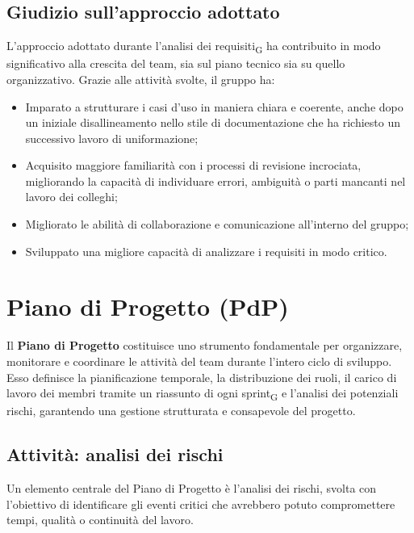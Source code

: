 \documentclass[11pt,a4paper]{article}
\newcommand{\gls}[1]{#1\textsubscript{G}}
\begin{document}
\subsection{Giudizio sull'approccio adottato}
L’approccio adottato durante l’\gls{analisi dei requisiti} ha contribuito in modo significativo alla crescita del team, sia sul piano tecnico sia su quello organizzativo. Grazie alle attività svolte, il gruppo ha:
\begin{itemize}
\item Imparato a strutturare i casi d’uso in maniera chiara e coerente, anche dopo un iniziale disallineamento nello stile di documentazione che ha richiesto un successivo lavoro di uniformazione;
\item Acquisito maggiore familiarità con i processi di revisione incrociata, migliorando la capacità di individuare errori, ambiguità o parti mancanti nel lavoro dei colleghi;
\item Migliorato le abilità di collaborazione e comunicazione all'interno del gruppo;
\item Sviluppato una migliore capacità di analizzare i requisiti in modo critico.
\end{itemize}

\newpage

\section{Piano di Progetto (PdP)}
Il \textbf{Piano di Progetto} costituisce uno strumento fondamentale per organizzare, monitorare e coordinare le attività del team durante l’intero ciclo di sviluppo. Esso definisce la pianificazione temporale, la distribuzione dei ruoli, il carico di lavoro dei membri tramite un riassunto di ogni \gls{sprint} e l’analisi dei potenziali rischi, garantendo una gestione strutturata e consapevole del progetto.

\subsection{Attività: analisi dei rischi}
Un elemento centrale del Piano di Progetto è l’analisi dei rischi, svolta con l’obiettivo di identificare gli eventi critici che avrebbero potuto compromettere tempi, qualità o continuità del lavoro.
\end{document}
